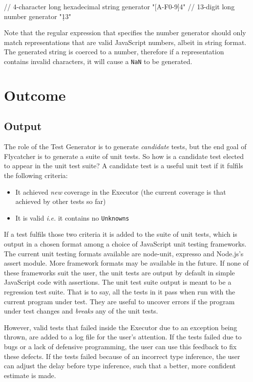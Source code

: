 \begin{code}[caption=Custom data generators,label=custom]
// 4-character long hexadecimal string generator
"[A-F0-9]{4}"
// 13-digit long number generator
"\d{13}"
\end{code}

Note that the regular expression that specifies the number generator should only match representations that are valid JavaScript numbers, albeit in string format. The generated string is coerced to a number, therefore if a representation contains invalid characters, it will cause a \texttt{NaN} to be generated.

\section{Outcome}
\subsection{Output}
The role of the \textsf{Test Generator} is to generate \emph{candidate} tests, but the end goal of \textsf{Flycatcher} is to generate a suite of unit tests. So how is a candidate test elected to appear in the unit test suite? A candidate test is a useful unit test if it fulfils the following criteria:

\begin{itemize}
   \item It achieved \emph{new} coverage in the \textsf{Executor} (the current coverage is that achieved by other tests so far)
   \item It is valid \emph{i.e.} it contains no \texttt{Unknowns}
\end{itemize}

If a test fulfils those two criteria it is added to the suite of unit tests, which is output in a chosen format among a choice of JavaScript unit testing frameworks. The current unit testing formats available are \textsf{node-unit}, \textsf{expresso} and \textsf{Node.js}'s \textsf{assert} module. More framework formats may be available in the future. If none of these frameworks suit the user, the unit tests are output by default in simple JavaScript code with assertions. The unit test suite output is meant to be a regression test suite. That is to say, all the tests in it pass when run with the current program under test. They are useful to uncover errors if the program under test changes and \emph{breaks} any of the unit tests.

However, valid tests that failed inside the \textsf{Executor} due to an exception being thrown, are added to a log file for the user's attention. If the tests failed due to bugs or a lack of defensive programming, the user can use this feedback to fix these defects. If the tests failed because of an incorrect type inference, the user can adjust the delay before type inference, such that a better, more confident estimate is made.

